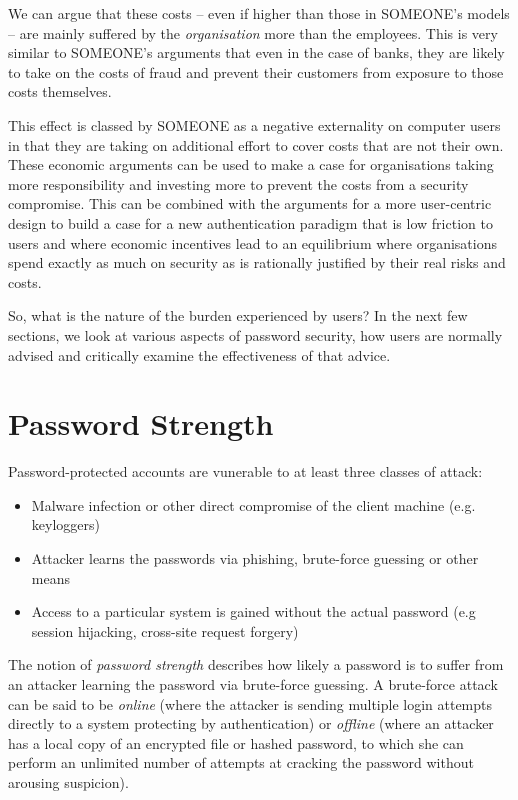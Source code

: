 \documentclass{report}
\begin{document}
We can argue that these costs -- even if higher than those
in SOMEONE's models -- are mainly suffered by the \emph{organisation}
more than the employees. This is very similar to SOMEONE's
arguments that even in the case of banks, they are likely
to take on the costs of fraud and prevent their customers
from exposure to those costs themselves.

This effect is classed
by SOMEONE as a negative externality on computer users in
that they are taking on additional effort to cover costs
that are not their own. These economic arguments can be
used to make a case for organisations taking more
responsibility and investing more to prevent the costs
from a security compromise. This can be combined with
the arguments for a more user-centric design
\parencite{adams1999users} to build a case for a new
authentication paradigm that is low friction to users and
where economic incentives lead to an equilibrium where
organisations spend exactly as much on security as
is rationally justified by their real risks and costs.

So, what is the nature of the burden experienced by users?
In the next few sections, we look at various aspects
of password security, how users are normally advised
and critically examine the effectiveness of that advice.

\section{Password Strength}
\label{sec:strength}

Password-protected accounts are vunerable to at least three
classes of attack\parencite{florencio2014password}:

\begin{itemize}
  \item Malware infection or other direct compromise of the client machine (e.g. keyloggers)
  \item Attacker learns the passwords via phishing, brute-force guessing or other means
  \item Access to a particular system is gained without the actual password (e.g session hijacking, cross-site request forgery)
\end{itemize}

The notion of \emph{password strength} describes how likely
a password is to suffer from an attacker learning the password via brute-force
guessing. A brute-force attack can be said to be \emph{online} (where the
attacker is sending multiple login attempts directly to a system protecting
by authentication) or \emph{offline} (where an attacker has a local copy of
an encrypted file or hashed password, to which she can perform an unlimited
number of attempts at cracking the password without arousing suspicion).
\end{document}
